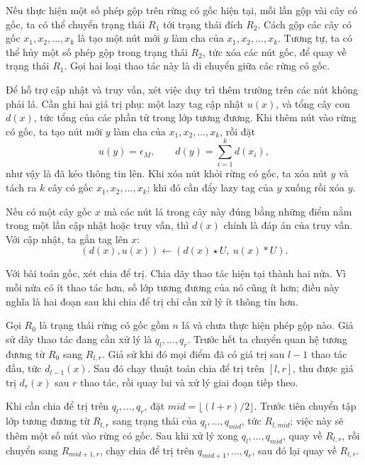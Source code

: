 \documentclass[11pt]{article}
\begin{document}
Nếu thực hiện một số phép gộp trên rừng có gốc hiện tại, mỗi lần gộp vài cây có
gốc, ta có thể chuyển trạng thái \(R_1\) tới trạng thái đích \(R_2\). Cách gộp
các cây có gốc \(x_1,x_2,\ldots,x_k\) là tạo một nút mới \(y\) làm cha của
\(x_1,x_2,\ldots,x_k\). Tương tự, ta có thể hủy một số phép gộp trong trạng
thái \(R_2\), tức xóa các nút gốc, để quay về trạng thái \(R_1\). Gọi hai loại
thao tác này là di chuyển giữa các rừng có gốc.

Để hỗ trợ cập nhật và truy vấn, xét việc duy trì thêm trường trên các nút không
phải lá. Cần ghi hai giá trị phụ: một lazy tag cập nhật \(u(x)\), và tổng cây
con \(d(x)\), tức tổng của các phần tử trong lớp tương đương. Khi thêm nút vào
rừng có gốc, ta tạo nút mới \(y\) làm cha của \(x_1,x_2,\ldots,x_k\), rồi đặt
\[
  u(y)=\epsilon_M,\qquad d(y)=\sum_{i=1}^{k} d(x_i),
\]
như vậy là đã kéo thông tin lên. Khi xóa nút khỏi rừng có gốc, ta xóa nút
\(y\) và tách ra \(k\) cây có gốc \(x_1,x_2,\ldots,x_k\); khi đó cần đẩy lazy
tag của \(y\) xuống rồi xóa \(y\).

Nếu có một cây gốc \(x\) mà các nút lá trong cây này đúng bằng những điểm nằm
trong một lần cập nhật hoặc truy vấn, thì \(d(x)\) chính là đáp án của truy
vấn. Với cập nhật, ta gắn tag lên \(x\):
\[
  (d(x),u(x))\leftarrow (d(x)\star U,\ u(x)*U).
\]

Với bài toán gốc, xét chia để trị. Chia dãy thao tác hiện tại thành hai nửa.
Vì mỗi nửa có ít thao tác hơn, số lớp tương đương của nó cũng ít hơn; điều này
nghĩa là hai đoạn sau khi chia để trị chỉ cần xử lý ít thông tin hơn.

Gọi \(R_0\) là trạng thái rừng có gốc gồm \(n\) lá và chưa thực hiện phép gộp
nào. Giả sử dãy thao tác đang cần xử lý là \(q_l,\ldots,q_r\). Trước hết ta
chuyển quan hệ tương đương từ \(R_0\) sang \(R_{l,r}\). Giả sử khi đó mọi điểm
đã có giá trị sau \(l-1\) thao tác đầu, tức \(d_{l-1}(x)\). Sau đó chạy thuật
toán chia để trị trên \([l,r]\), thu được giá trị \(d_r(x)\) sau \(r\) thao
tác, rồi quay lui và xử lý giai đoạn tiếp theo.

Khi cần chia để trị trên \(q_l,\ldots,q_r\), đặt
\(\mathit{mid}=\lfloor(l+r)/2\rfloor\). Trước tiên chuyển tập lớp tương đương
từ \(R_{l,r}\) sang trạng thái của \(q_l,\ldots,q_{\mathit{mid}}\), tức
\(R_{l,\mathit{mid}}\); việc này sẽ thêm một số nút vào rừng có gốc. Sau khi
xử lý xong \(q_l,\ldots,q_{\mathit{mid}}\), quay về \(R_{l,r}\), rồi chuyển
sang \(R_{\mathit{mid}+1,r}\), chạy chia để trị trên
\(q_{\mathit{mid}+1},\ldots,q_r\), sau đó lại quay về \(R_{l,r}\).
\end{document}
